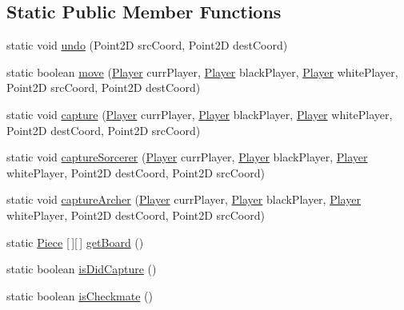 \subsection*{Static Public Member Functions}
\begin{DoxyCompactItemize}
\item 
static void \mbox{\hyperlink{classcom_1_1chess_1_1model_1_1logic_1_1_board_a3295d1cfd71688d099864ea71155a883}{undo}} (Point2D src\+Coord, Point2D dest\+Coord)
\item 
static boolean \mbox{\hyperlink{classcom_1_1chess_1_1model_1_1logic_1_1_board_acb69373c059e1b11df5335375f1a6c8e}{move}} (\mbox{\hyperlink{classcom_1_1chess_1_1model_1_1logic_1_1_player}{Player}} curr\+Player, \mbox{\hyperlink{classcom_1_1chess_1_1model_1_1logic_1_1_player}{Player}} black\+Player, \mbox{\hyperlink{classcom_1_1chess_1_1model_1_1logic_1_1_player}{Player}} white\+Player, Point2D src\+Coord, Point2D dest\+Coord)
\item 
static void \mbox{\hyperlink{classcom_1_1chess_1_1model_1_1logic_1_1_board_a36d7690740c0df5bf65ad19a77301cb1}{capture}} (\mbox{\hyperlink{classcom_1_1chess_1_1model_1_1logic_1_1_player}{Player}} curr\+Player, \mbox{\hyperlink{classcom_1_1chess_1_1model_1_1logic_1_1_player}{Player}} black\+Player, \mbox{\hyperlink{classcom_1_1chess_1_1model_1_1logic_1_1_player}{Player}} white\+Player, Point2D dest\+Coord, Point2D src\+Coord)
\item 
static void \mbox{\hyperlink{classcom_1_1chess_1_1model_1_1logic_1_1_board_afd97b49c40af20cbf9db210397b558fb}{capture\+Sorcerer}} (\mbox{\hyperlink{classcom_1_1chess_1_1model_1_1logic_1_1_player}{Player}} curr\+Player, \mbox{\hyperlink{classcom_1_1chess_1_1model_1_1logic_1_1_player}{Player}} black\+Player, \mbox{\hyperlink{classcom_1_1chess_1_1model_1_1logic_1_1_player}{Player}} white\+Player, Point2D dest\+Coord, Point2D src\+Coord)
\item 
static void \mbox{\hyperlink{classcom_1_1chess_1_1model_1_1logic_1_1_board_a745ae99cf359e72c979ef3683193efc7}{capture\+Archer}} (\mbox{\hyperlink{classcom_1_1chess_1_1model_1_1logic_1_1_player}{Player}} curr\+Player, \mbox{\hyperlink{classcom_1_1chess_1_1model_1_1logic_1_1_player}{Player}} black\+Player, \mbox{\hyperlink{classcom_1_1chess_1_1model_1_1logic_1_1_player}{Player}} white\+Player, Point2D dest\+Coord, Point2D src\+Coord)
\item 
static \mbox{\hyperlink{classcom_1_1chess_1_1model_1_1pieces_1_1_piece}{Piece}} \mbox{[}$\,$\mbox{]}\mbox{[}$\,$\mbox{]} \mbox{\hyperlink{classcom_1_1chess_1_1model_1_1logic_1_1_board_a250307910cbd0be9c6e28c0a4a3ac318}{get\+Board}} ()
\item 
static boolean \mbox{\hyperlink{classcom_1_1chess_1_1model_1_1logic_1_1_board_aeb711012b2b33d76efc39bf1a2f6e74c}{is\+Did\+Capture}} ()
\item 
static boolean \mbox{\hyperlink{classcom_1_1chess_1_1model_1_1logic_1_1_board_a73e462a99727ad81eadab7d05d2d27a3}{is\+Checkmate}} ()
\end{DoxyCompactItemize}
